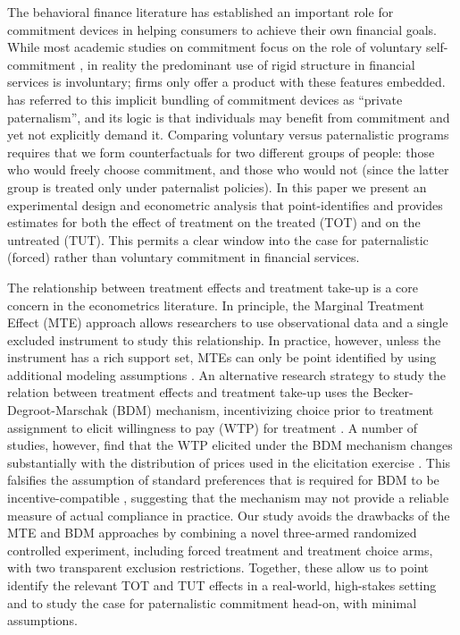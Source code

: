 \documentclass[ecta,nameyear,final]{econsocart}
\begin{document}
The behavioral finance literature has established an important role for commitment devices in helping consumers to achieve their own financial goals.  While most academic studies on commitment focus on the role of voluntary self-commitment \citep{thaler2004save, prina2015banking, brune2016facilitating, callen2019headwaters, Pascaline, Ashraf}, in reality the predominant use of rigid structure in financial services is involuntary; firms only offer a product with these features embedded.  \cite{Laibson2018} has referred to this implicit bundling of commitment devices as ``private paternalism'', and its logic is that individuals may benefit from commitment and yet not explicitly demand it.  Comparing voluntary versus paternalistic programs requires that we form counterfactuals for two different groups of people: those who would freely choose commitment, and those who would not (since the latter group is treated only under paternalist policies). In this paper we present an experimental design and econometric analysis that point-identifies and provides estimates for both the effect of treatment on the treated (TOT) and on the untreated (TUT). This permits a clear window into the case for paternalistic (forced) rather than voluntary commitment in financial services.

The relationship between treatment effects and treatment take-up is a core concern in the econometrics literature. In principle, the Marginal Treatment Effect (MTE) approach allows researchers to use observational data and a single excluded instrument to study this relationship. In practice, however, unless the instrument has a rich support set, MTEs can only be point identified by using additional modeling assumptions \citep{mogstad2018using}. An alternative research strategy to study the relation between treatment effects and treatment take-up uses the Becker-Degroot-Marschak (BDM) mechanism, incentivizing choice prior to treatment assignment to elicit willingness to pay (WTP) for treatment \citep{becker1964measuring}. 
A number of studies, however, find that the WTP elicited under the BDM mechanism changes substantially with the distribution of prices used in the elicitation exercise \citep{bohm1997eliciting,banerji2014detection}. This falsifies the assumption of standard preferences that is required for BDM to be incentive-compatible \cite{mamadehussene2023reliability}, suggesting that the mechanism may not provide a reliable measure of actual compliance  in practice.
Our study avoids the drawbacks of the MTE and BDM approaches by combining a novel three-armed randomized controlled experiment, including forced treatment and treatment choice arms, with two transparent exclusion restrictions. Together, these allow us to point identify the relevant TOT and TUT effects in a real-world, high-stakes setting and to study the case for paternalistic commitment head-on, with minimal assumptions.
\end{document}
